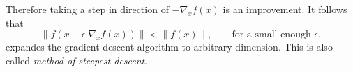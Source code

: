 Therefore taking a step in direction of \(-\nabla_x f(x)\) is an improvement.
It follows that
\begin{equation}
    \lVert f(x - \epsilon \; \nabla_x f(x)) \rVert < \lVert f(x) \rVert, \qquad \text{for a small enough } \epsilon,
\end{equation}
expandes the gradient descent algorithm to arbitrary dimension. This is also called \emph{method of steepest descent}.
